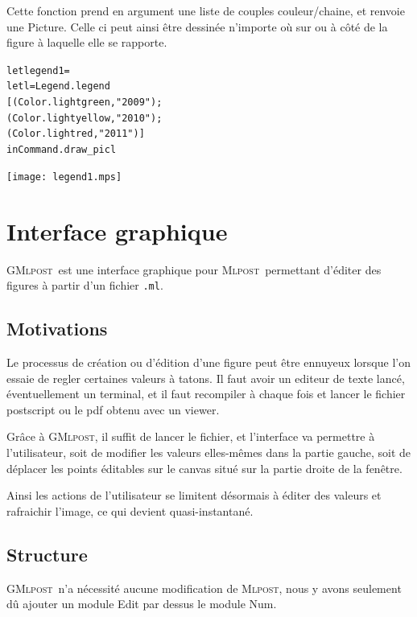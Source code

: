 \documentclass[a4paper,12pt]{article}
\newcommand{\mlpost}{\textsc{Mlpost}}
\newcommand{\gmlpost}{\textsc{GMlpost}}
\begin{document}
Cette fonction prend en argument une liste de couples couleur/chaine, et renvoie une Picture. Celle ci peut ainsi être dessinée n'importe où sur ou à côté de la figure à laquelle elle se rapporte.

\bigskip

\begin{minipage}{0.5\linewidth}
  \begin{alltt}
    let legend1 = 
    let l = Legend.legend
    [(Color.lightgreen,"2009");
      (Color.lightyellow,"2010");
      (Color.lightred,"2011")]
    in Command.draw_pic l
  \end{alltt}
\end{minipage}
\begin{minipage}{0.5\linewidth}
  \begin{center}
    \texttt{[image: legend1.mps]}
  \end{center}
\end{minipage}


\section{Interface graphique}
\gmlpost\ est une interface graphique pour \mlpost\ permettant d'éditer des figures à partir d'un fichier \texttt{.ml}. 
\subsection{Motivations}
Le processus de création ou d'édition d'une figure peut être ennuyeux lorsque l'on essaie de regler certaines valeurs à tatons. Il faut avoir un editeur de texte lancé, éventuellement un terminal, et il faut recompiler à chaque fois et lancer le fichier postscript ou le pdf obtenu avec un viewer.

Grâce à \gmlpost, il suffit de lancer le fichier, et l'interface va permettre à l'utilisateur, soit de modifier les valeurs elles-mêmes dans la partie gauche, soit de déplacer les points éditables sur le canvas situé sur la partie droite de la fenêtre.

Ainsi les actions de l'utilisateur se limitent désormais à éditer des valeurs et rafraichir l'image, ce qui devient quasi-instantané.
\subsection{Structure}
\gmlpost\ n'a nécessité aucune modification de \mlpost, nous y avons seulement dû ajouter un module Edit par dessus le module Num.
\end{document}
